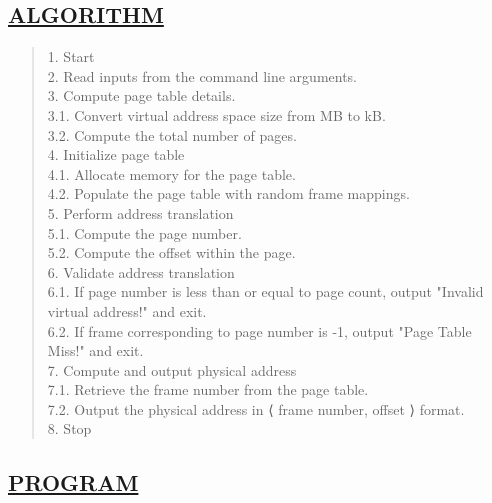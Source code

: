 \documentclass[a4paper, 12pt]{article}
\begin{document}
\subsection*{\underline{ALGORITHM}}
\begin{quote}
1. Start\\
2. Read inputs from the command line arguments.\\
3. Compute page table details.\\
\hspace*{1cm} 3.1. Convert virtual address space size from MB to kB.\\
\hspace*{1cm} 3.2. Compute the total number of pages.\\
4. Initialize page table\\
\hspace*{1cm} 4.1. Allocate memory for the page table.\\
\hspace*{1cm} 4.2. Populate the page table with random frame mappings.\\
5. Perform address translation\\
\hspace*{1cm} 5.1. Compute the page number.\\ 
\hspace*{1cm} 5.2. Compute the offset within the page.\\
6. Validate address translation \\
\hspace*{1cm} 6.1. If page number is less than or equal to page count, output "Invalid virtual address!" and exit.\\
\hspace*{1cm} 6.2. If frame corresponding to page number is -1, output "Page Table Miss!" and exit.\\
7. Compute and output physical address\\
\hspace*{1cm} 7.1. Retrieve the frame number from the page table.\\
\hspace*{1cm} 7.2. Output the physical address in ⟨ frame number, offset ⟩ format.\\
8. Stop \\
\end{quote}

\subsection*{\underline{PROGRAM}}
\begin{quote}
\inputminted[fontsize=\small,breaklines,breakanywhere]{c}{paging_address_translation.c}
\end{quote}
\end{document}
